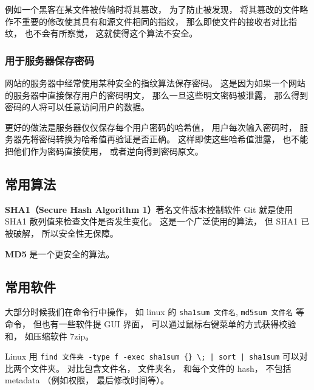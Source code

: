 例如一个黑客在某文件被传输时将其篡改， 为了防止被发现， 将其篡改的文件略作不重要的修改使其具有和源文件相同的指纹， 那么即使文件的接收者对比指纹， 也不会有所察觉， 这就使得这个算法不安全。

\subsubsection{用于服务器保存密码}
网站的服务器中经常使用某种安全的指纹算法保存密码。 这是因为如果一个网站的服务器中直接保存用户的密码明文， 那么一旦这些明文密码被泄露， 那么得到密码的人将可以任意访问用户的数据。

更好的做法是服务器仅仅保存每个用户密码的哈希值， 用户每次输入密码时， 服务器先将密码转换为哈希值再验证是否正确。 这样即使这些哈希值泄露， 也不能把他们作为密码直接使用， 或者逆向得到密码原文。

\subsection{常用算法}
\textbf{SHA1（Secure Hash Algorithm 1）}著名文件版本控制软件 Git %
就是使用 SHA1 散列值来检查文件是否发生变化。 这是一个广泛使用的算法， 但 SHA1 已被破解， 所以安全性无保障。

\textbf{MD5} 是一个更安全的算法。

\subsection{常用软件}
大部分时候我们在命令行中操作， 如 linux 的 \verb|sha1sum 文件名|, \verb|md5sum 文件名| 等命令， 但也有一些软件提 GUI 界面， 可以通过鼠标右键菜单的方式获得校验和， 如压缩软件 7zip。

Linux 用 \verb`find 文件夹 -type f -exec sha1sum {} \; | sort | sha1sum` 可以对比两个文件夹。 对比包含文件名， 文件夹名， 和每个文件的 hash， 不包括 metadata （例如权限， 最后修改时间等）。
